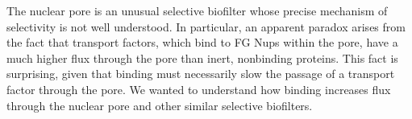 %
%

The nuclear pore is an unusual selective biofilter whose precise mechanism of selectivity is not well understood.  In particular, an apparent paradox arises from the fact that transport factors, which bind to FG Nups within the pore, have a much higher flux through the pore than inert, nonbinding proteins.  This fact is surprising, given that binding must necessarily slow the passage of a transport factor through the pore.  We wanted to understand how binding increases flux through the nuclear pore and other similar selective biofilters.

